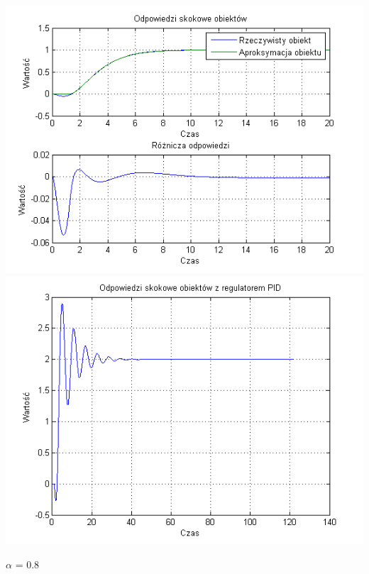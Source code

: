 \documentclass[10pt,a4paper]{article}
\begin{document}
\begin{center}
\includegraphics[scale=1]{images/dwa/skrypt_237.png}\\
\includegraphics[scale=1]{images/dwa/skrypt_238.png}\\
\end{center}
\newpage
$\alpha$ = 0.8
\end{document}
